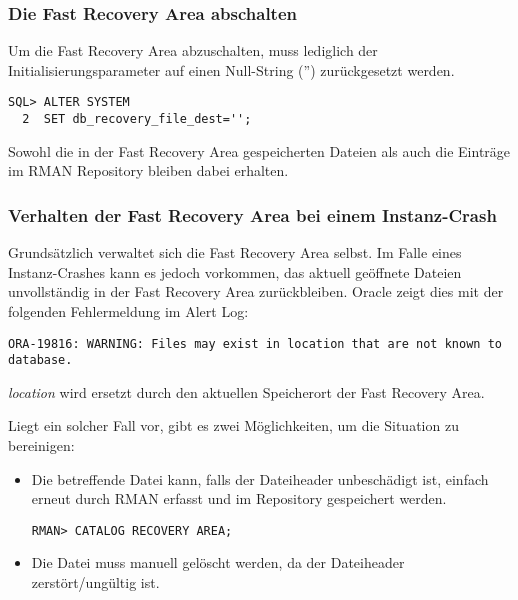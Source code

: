           \begin{literaturinternet}
            \item \cite{sthref3529}
            \item \cite{sthref3528}
          \end{literaturinternet}

        \subsubsection{Die Fast Recovery Area abschalten}
          Um die Fast Recovery Area abzuschalten, muss lediglich der Initialisierungsparameter  auf einen Null-String ('') zurückgesetzt werden.
          \begin{lstlisting}[caption={Die Fast Recovery Area abschalten},label=admin1037,language=oracle_sql]
SQL> ALTER SYSTEM
  2  SET db_recovery_file_dest='';
          \end{lstlisting}
          Sowohl die in der Fast Recovery Area gespeicherten Dateien als auch die Einträge im RMAN Repository bleiben dabei erhalten.
        \subsubsection{Verhalten der Fast Recovery Area bei einem Instanz-Crash}
          Grundsätzlich verwaltet sich die Fast Recovery Area selbst. Im Falle eines Instanz-Crashes kann es jedoch vorkommen, das aktuell geöffnete Dateien unvollständig in der Fast Recovery Area zurückbleiben. Oracle zeigt dies mit der folgenden Fehlermeldung im Alert Log:
          \begin{lstlisting}[caption={Beschädigte Dateien in der Fast Recovery Area},label=admin1038,language=rman]
ORA-19816: WARNING: Files may exist in location that are not known to database.
          \end{lstlisting}
          \textit{location} wird ersetzt durch den aktuellen Speicherort der Fast Recovery Area.

          Liegt ein solcher Fall vor, gibt es zwei Möglichkeiten, um die Situation zu bereinigen:
          \begin{itemize}
            \item Die betreffende Datei kann, falls der Dateiheader unbeschädigt ist, einfach erneut durch RMAN erfasst und im Repository gespeichert werden.
              \begin{lstlisting}[caption={Beschädigte Dateien in der Fast Recovery Area neu katalogisieren},label=admin1039,language=rman]
RMAN> CATALOG RECOVERY AREA;
              \end{lstlisting}
            \item Die Datei muss manuell gelöscht werden, da der Dateiheader zerstört/ungültig ist.
          \end{itemize}

